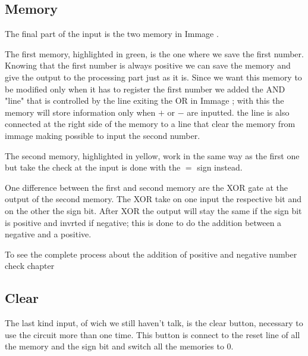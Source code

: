 \documentclass{article}
\begin{document}



\subsection{Memory}
The final part of the input is the two memory in Immage %
.


\vspace{3mm}

The first memory, highlighted in green, is the one where we save the first number. 
Knowing that the first number is always positive we can save the memory and give the output to the processing part just as it is. 
Since we want this memory to be modified only when it has to register the first number we added the AND "line" that is controlled by the line exiting the OR in Immage%
; with this the memory will store information only when $+$ or $-$ are inputted. the line is also connected at the right side of the memory to a line that clear the memory from immage%
 making possible to input the second number.

\vspace{3mm}

The second memory, highlighted in yellow, work in the same way as the first one but take the check at the input is done with the $=$ sign instead.

One difference between the first and second memory are the XOR gate at the output of the second memory. The XOR take on one input the respective bit and on the other the sign bit. After XOR the output will stay the same if the sign bit is positive and invrted if negative; this is done to do the addition between a negative and a positive. 

\vspace{3mm}

To see the complete process about the addition of positive and negative number check chapter %

\subsection{Clear}

The last kind input, of wich we still haven't talk, is the clear button, necessary to use the circuit more than one time. 
This button is connect to the reset line of all the memory and the sign bit and switch all the memories to 0. 
\end{document}
